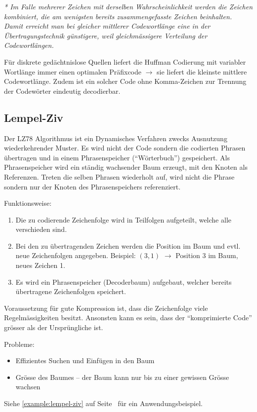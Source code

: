 \textit{* Im Falle mehrerer Zeichen mit derselben Wahrscheinlichkeit werden die
Zeichen kombiniert, die am wenigsten bereits zusammengefasste Zeichen
beinhalten. Damit erreicht man bei gleicher mittlerer Codewortlänge eine in
der Übertragungstechnik günstigere, weil gleichmässigere Verteilung der
Codewortlängen.}

Für diskrete gedächtnislose Quellen liefert die Huffman Codierung mit variabler
Wortlänge immer einen optimalen Präfixcode $\rightarrow$ sie liefert die
kleinste mittlere Codewortlänge. Zudem ist ein solcher Code ohne Komma-Zeichen
zur Trennung der Codewörter eindeutig decodierbar.


\subsection{Lempel-Ziv}

Der LZ78 Algorithmus ist ein Dynamisches Verfahren zwecks Ausnutzung
wiederkehrender Muster. Es wird nicht der Code sondern die codierten Phrasen
übertragen und in einem Phrasenspeicher (``Wörterbuch'') gespeichert. Als
Phrasenspeicher wird ein ständig wachsender Baum erzeugt, mit den Knoten als
Referenzen. Treten die selben Phrasen wiederholt auf, wird nicht die Phrase
sondern nur der Knoten des Phrasenspeichers referenziert.

Funktionsweise:

\begin{enumerate}
	\item Die zu codierende Zeichenfolge wird in Teilfolgen aufgeteilt, welche
		alle verschieden sind.
	\item Bei den zu übertragenden Zeichen werden die Position im Baum und evtl.
		neue Zeichenfolgen angegeben. Beispiel: $(3,1)$ $\rightarrow$ Position 3 im
		Baum, neues Zeichen 1.
	\item Es wird ein Phrasenspeicher (Decoderbaum) aufgebaut, welcher bereits
		übertragene Zeichenfolgen speichert.
\end{enumerate}

Voraussetzung für gute Kompression ist, dass die Zeichenfolge viele
Regelmässigkeiten besitzt. Ansonsten kann es sein, dass der ``komprimierte
Code'' grösser als der Ursprüngliche ist.

Probleme:
\begin{itemize}
	\item Effizientes Suchen und Einfügen in den Baum
	\item Grösse des Baumes -- der Baum kann nur bis zu einer gewissen Grösse wachsen
\end{itemize}

Siehe \autoref{example:lempel-ziv} auf Seite~\pageref{example:lempel-ziv}
für ein Anwendungsbeispiel.
